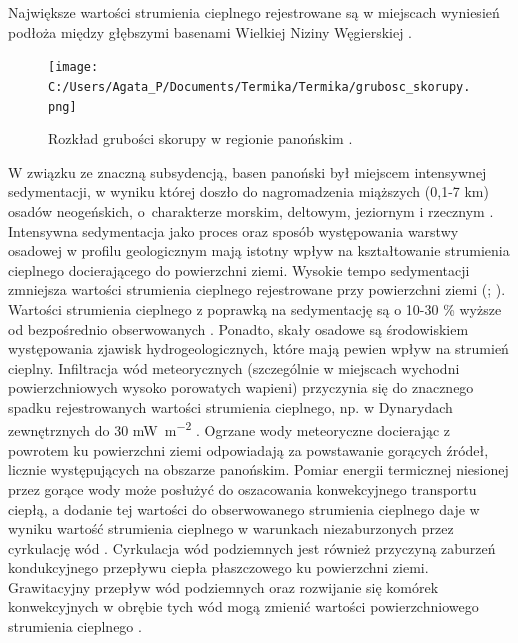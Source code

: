 \documentclass[11.5pt,twoside]{report}
\begin{document}
Największe wartości strumienia cieplnego rejestrowane są w miejscach wyniesień podłoża między głębszymi basenami Wielkiej Niziny Węgierskiej \parencite{Bekesi.2017}. 

\begin{figure}[h]
	\centering
	\texttt{[image: C:/Users/Agata\_P/Documents/Termika/Termika/grubosc\_skorupy.png]}
	\caption{Rozkład grubości skorupy w regionie panońskim \parencite{Horvath.2015}.}
	\label{horvath}
\end{figure}

 W związku ze znaczną subsydencją, basen panoński był miejscem intensywnej sedymentacji, w wyniku której doszło do nagromadzenia miąższych (0,1-7 km) osadów neogeńskich, o~charakterze morskim, deltowym, jeziornym i rzecznym \parencite{Toth.2001}. Intensywna sedymentacja jako proces oraz sposób występowania warstwy osadowej w profilu geologicznym mają istotny wpływ na kształtowanie strumienia cieplnego docierającego do powierzchni ziemi. Wysokie tempo sedymentacji zmniejsza wartości strumienia cieplnego rejestrowane przy powierzchni ziemi (\cite{Lenkey.2017}; \cite{Horvath.2015}). Wartości strumienia cieplnego z poprawką na sedymentację są o 10-30 \% wyższe od bezpośrednio obserwowanych \parencite{Lenkey.2002}. Ponadto, skały osadowe są środowiskiem występowania zjawisk hydrogeologicznych, które mają pewien wpływ na strumień cieplny. Infiltracja wód meteorycznych (szczególnie w miejscach wychodni powierzchniowych wysoko porowatych wapieni) przyczynia się do znacznego spadku rejestrowanych wartości strumienia cieplnego, np. w Dynarydach zewnętrznych do 30 \si{\milli\watt\per\meter\squared} \parencite{Horvath.2015}. Ogrzane wody meteoryczne docierając z powrotem ku powierzchni ziemi odpowiadają za powstawanie gorących \'{z}ródeł, licznie występujących na obszarze panońskim. Pomiar energii termicznej niesionej przez gorące wody może posłużyć do oszacowania konwekcyjnego transportu ciepłą, a dodanie tej wartości do obserwowanego strumienia cieplnego daje w wyniku wartość strumienia cieplnego w warunkach niezaburzonych przez cyrkulację wód \parencite{Lenkey.2017}. Cyrkulacja wód podziemnych jest również przyczyną zaburzeń kondukcyjnego przepływu ciepła płaszczowego ku powierzchni ziemi. Grawitacyjny przepływ wód podziemnych oraz rozwijanie się komórek konwekcyjnych w obrębie tych wód mogą zmienić wartości powierzchniowego strumienia cieplnego \parencite{Horvath.2015}. 
 
\end{document}

